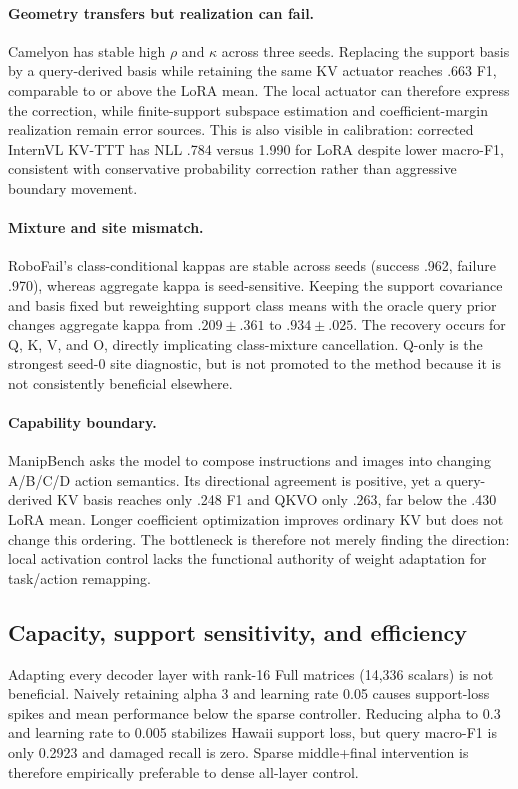 \documentclass[conference]{IEEEtran}
\newcommand{\KVTTT}{\textsc{KV-TTT}}
\begin{document}
\paragraph{Geometry transfers but realization can fail.}
Camelyon has stable high $\rho$ and $\kappa$ across three seeds.  Replacing the
support basis by a query-derived basis while retaining the same KV actuator
reaches .663 F1, comparable to or above the LoRA mean.  The local actuator can
therefore express the correction, while finite-support subspace estimation and
coefficient-margin realization remain error sources.  This is also visible in
calibration: corrected InternVL \KVTTT{} has NLL .784 versus 1.990 for LoRA
despite lower macro-F1, consistent with conservative probability correction
rather than aggressive boundary movement.

\paragraph{Mixture and site mismatch.}
RoboFail's class-conditional kappas are stable across seeds (success .962,
failure .970), whereas aggregate kappa is seed-sensitive.  Keeping the
support covariance and basis fixed but reweighting support class means with
the oracle query prior changes aggregate kappa from $.209\pm.361$ to
$.934\pm.025$.  The recovery occurs for Q, K, V, and O, directly implicating
class-mixture cancellation.  Q-only is the strongest seed-0 site diagnostic,
but is not promoted to the method because it is not consistently beneficial
elsewhere.

\paragraph{Capability boundary.}
ManipBench asks the model to compose instructions and images into changing
A/B/C/D action semantics.  Its directional agreement is positive, yet a
query-derived KV basis reaches only .248 F1 and QKVO only .263, far below the
.430 LoRA mean.  Longer coefficient optimization improves ordinary KV but
does not change this ordering.  The bottleneck is therefore not merely finding
the direction: local activation control lacks the functional authority of
weight adaptation for task/action remapping.

\subsection{Capacity, support sensitivity, and efficiency}
Adapting every decoder layer with rank-16 Full matrices (14,336 scalars) is not
beneficial. Naively retaining alpha 3 and learning rate 0.05 causes support-loss
spikes and mean performance below the sparse controller. Reducing alpha to 0.3
and learning rate to 0.005 stabilizes Hawaii support loss, but query macro-F1
is only 0.2923 and damaged recall is zero. Sparse middle+final intervention is
therefore empirically preferable to dense all-layer control.
\end{document}
